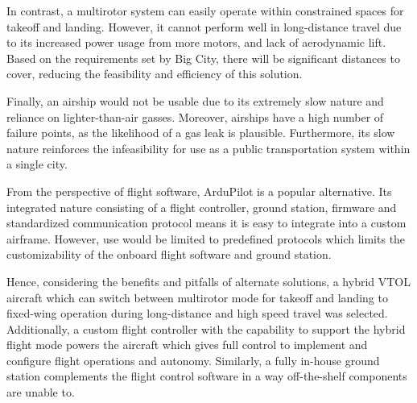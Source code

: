 In contrast, a multirotor system can easily operate within constrained spaces
for takeoff and landing. However, it cannot perform well in long-distance
travel due to its increased power usage from more motors, and lack of
aerodynamic lift. Based on the requirements set by Big City, there will be
significant distances to cover, reducing the feasibility and efficiency of this
solution.

Finally, an airship would not be usable due to its extremely slow nature and
reliance on lighter-than-air gasses. Moreover, airships have a high number of
failure points, as the likelihood of a gas leak is plausible. Furthermore, its
slow nature reinforces the infeasibility for use as a public transportation
system within a single city.

From the perspective of flight software, ArduPilot is a popular alternative.
Its integrated nature consisting of a flight controller, ground station,
firmware and standardized communication protocol means it is easy to integrate
into a custom airframe. However, use would be limited to predefined protocols
which limits the customizability of the onboard flight software and ground
station.

Hence, considering the benefits and pitfalls of alternate solutions, a hybrid VTOL aircraft which can switch between multirotor mode for takeoff and landing
to fixed-wing operation during long-distance and high speed travel was
selected. Additionally, a custom flight controller with the capability to
support the hybrid flight mode powers the aircraft which gives full control to
implement and configure flight operations and autonomy. Similarly, a fully
in-house ground station complements the flight control software in a way
off-the-shelf components are unable to.
